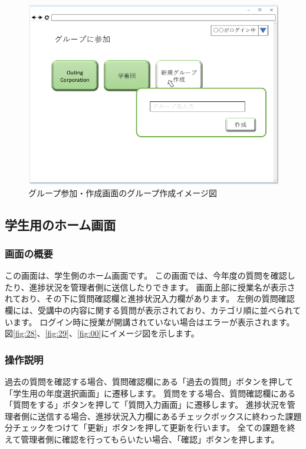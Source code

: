 \begin{figure}[phtbp]
  \begin{center}
    \includegraphics[width=1\linewidth,clip]{./img/27.png}
    \caption{グループ参加・作成画面のグループ作成イメージ図}\label{fig:27}
  \end{center}
\end{figure}

\newpage

\subsection{学生用のホーム画面}
\subsubsection{画面の概要}
この画面は、学生側のホーム画面です。
この画面では、今年度の質問を確認したり、進捗状況を管理者側に送信したりできます。
画面上部に授業名が表示されており、その下に質問確認欄と進捗状況入力欄があります。
左側の質問確認欄には、受講中の内容に関する質問が表示されており、カテゴリ順に並べられています。
ログイン時に授業が開講されていない場合はエラーが表示されます。
図\ref{fig:28}、\ref{fig:29}、\ref{fig:00}にイメージ図を示します。

\subsubsection{操作説明}
過去の質問を確認する場合、質問確認欄にある「過去の質問」ボタンを押して「学生用の年度選択画面」に遷移します。
質問をする場合、質問確認欄にある「質問をする」ボタンを押して「質問入力画面」に遷移します。
進捗状況を管理者側に送信する場合、進捗状況入力欄にあるチェックボックスに終わった課題分チェックをつけて「更新」ボタンを押して更新を行います。
全ての課題を終えて管理者側に確認を行ってもらいたい場合、「確認」ボタンを押します。

